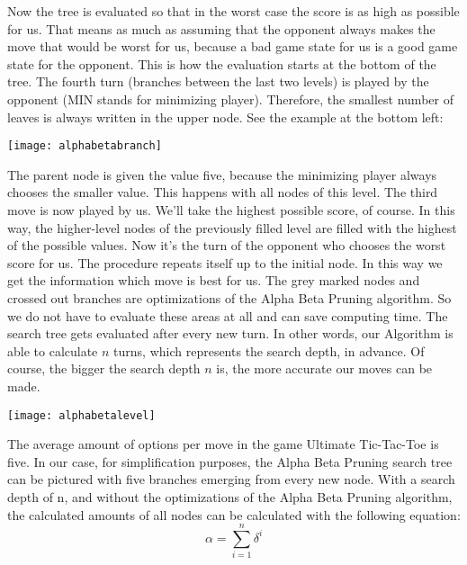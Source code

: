 Now the tree is evaluated so that in the worst case the score is as high as possible for us.
That means as much as assuming that the opponent always makes the move that would be worst for us, because a bad game state for us is a good game state for the opponent. This is how the evaluation starts at the bottom of the tree. The fourth turn (branches between the last two levels) is played by the opponent (MIN stands for minimizing player). Therefore, the smallest number of leaves is always written in the upper node. See the example at the bottom left:
\begin{fixedpic}
	\centering
	\texttt{[image: alphabetabranch]}
\end{fixedpic}
The parent node is given the value five, because the minimizing player always chooses the smaller value. This happens with all nodes of this level. The third move is now played by us. We'll take the highest possible score, of course. In this way, the higher-level nodes of the previously filled level are filled with the highest of the possible values. Now it's the turn of the opponent who chooses the worst score for us. The procedure repeats itself up to the initial node. In this way we get the information which move is best for us. The grey marked nodes and crossed out branches are optimizations of the Alpha Beta Pruning algorithm. So we do not have to evaluate these areas at all and can save computing time. 
The search tree gets evaluated after every new turn. In other words, our Algorithm is able to calculate $n$ turns, which represents the search depth, in advance. Of course, the bigger the search depth $n$ is, the more accurate our moves can be made.

\begin{fixedpic}
	\centering
	\texttt{[image: alphabetalevel]}
\end{fixedpic}

The average amount of options per move in the game Ultimate Tic-Tac-Toe is five. \cite{web:tsurel2013}
In our case, for simplification purposes, the Alpha Beta Pruning search tree can be pictured with five branches emerging from every new node. With a search depth of n, and without the optimizations of the Alpha Beta Pruning algorithm, the calculated amounts  of all nodes  can be calculated with the following  equation:  $$\alpha = \sum_{i=1}^{n} 	\delta^{i}$$

